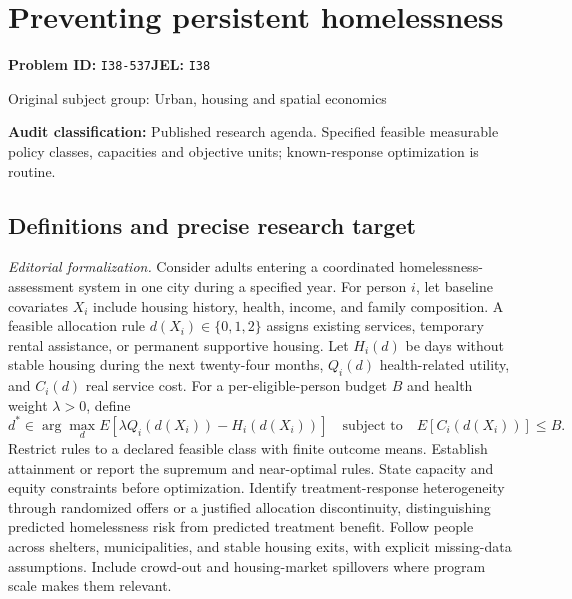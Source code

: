 \documentclass[11pt,a4paper]{article}
\begin{document}
\section*{Preventing persistent homelessness}
\textbf{Problem ID:} \texttt{I38-537}\quad \textbf{JEL:} \texttt{I38}\par
\label{problem:OP-0469}
{\sffamily\small\color{muted}Original subject group: Urban, housing and spatial economics\par}
\label{definitions:problem:30007751}
\textbf{Audit classification:} Published research agenda. Specified feasible measurable policy classes, capacities and objective units; known-response optimization is routine.
\subsection*{Definitions and precise research target}
\textit{Editorial formalization.} Consider adults entering a coordinated homelessness-assessment system in one city during a specified year. For person \(i\), let baseline covariates \(X_i\) include housing history, health, income, and family composition. A feasible allocation rule \(d(X_i)\in\{0,1,2\}\) assigns existing services, temporary rental assistance, or permanent supportive housing. Let \(H_i(d)\) be days without stable housing during the next twenty-four months, \(Q_i(d)\) health-related utility, and \(C_i(d)\) real service cost. For a per-eligible-person budget \(B\) and health weight \(\lambda>0\), define
\[d^*\in\arg\max_d E[\lambda Q_i(d(X_i))-H_i(d(X_i))]\quad\text{subject to}\quad E[C_i(d(X_i))]\leq B.\]
Restrict rules to a declared feasible class with finite outcome means. Establish attainment or report the supremum and near-optimal rules. State capacity and equity constraints before optimization. Identify treatment-response heterogeneity through randomized offers or a justified allocation discontinuity, distinguishing predicted homelessness risk from predicted treatment benefit. Follow people across shelters, municipalities, and stable housing exits, with explicit missing-data assumptions. Include crowd-out and housing-market spillovers where program scale makes them relevant.
\end{document}
